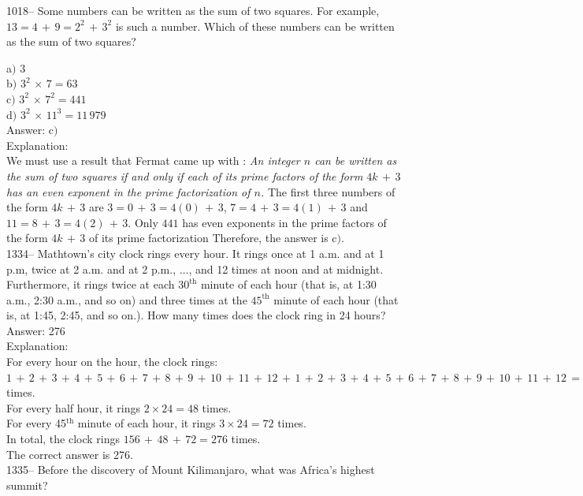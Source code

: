 \documentclass[letterpaper, 12pt]{article}
\begin{document}
1018-- Some numbers can be written as the sum of two squares. For example, $13=4\,+\,9=2^2\,+\,3^2$ is such a number. Which of these numbers can be written as the sum of two squares?

a$)$ $3$ \\
b$)$ $3^2\,\times\,7=63$\\
c$)$ $3^2\,\times\,7^2=441$ \\
d$)$ $3^2\,\times\,11^3=11\,979$\\

Answer: c$)$\\

Explanation: \\
We must use a result that Fermat came up with : {\sl An integer $n$
can be written as the sum of two squares if and only if each of its
prime factors of the form $4k\,+\,3$ has an even exponent in the
prime factorization of $n$.} The first three numbers of the form
$4k\,+\,3$ are $3=0\,+\,3=4(0)\,+\,3$, $7=4\,+\,3=4(1)\,+\,3$ and
$11=8\,+\,3=4(2)\,+\,3$. Only $441$ has even exponents in the prime
factors of the form $4k\,+\,3$ of its prime factorization
Therefore, the answer is c$)$.\\


1334-- Mathtown's city clock rings every hour. It rings once at 1
a.m. and at 1 p.m, twice at 2 a.m. and at 2 p.m., $\ldots$, and 12
times at noon and at midnight. Furthermore, it rings twice at each
$30^{\textrm{th}}$ minute of each hour (that is, at 1:30 a.m., 2:30
a.m., and so on) and three times at the $45^{\textrm{th}}$ minute
of each hour (that is, at 1:45, 2:45, and so on.). How many times does the clock ring in 24 hours?\\

Answer: 276\\

Explanation:\\
For every hour on the hour, the clock rings:
$1\,+\,2\,+\,3\,+\,4\,+\,5\,+\,6\,+\,7\,+\,8\,+\,9\,+\,10\,+\,11\,+\,12\,+\,1\,+\,2\,+\,3\,+\,4\,+\,5\,+\,6\,+\,7\,+\,8\,+\,9\,+\,10\,+\,11\,+\,12\,=\,156$
times.\\
For every half hour, it rings $2\times24=48$ times.\\
For every 45$^{\textrm{th}}$ minute of each hour, it rings $3\times24=72$ times.\\
In total, the clock rings $156\,+\,48\,+\,72=276$ times.\\
The correct answer is 276.\\


1335-- Before the discovery of Mount Kilimanjaro, what was Africa's highest summit?\\
\end{document}
